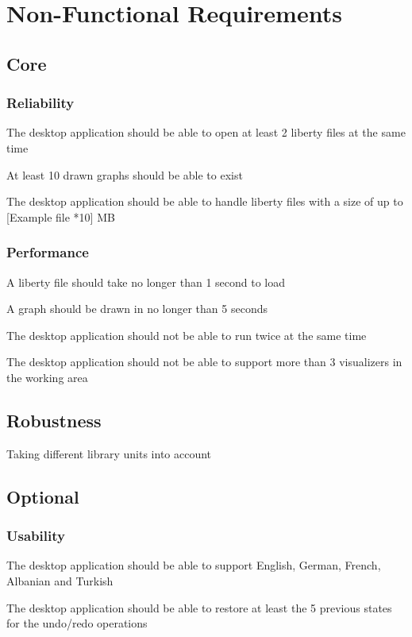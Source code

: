\documentclass[10pt,a4paper]{report}
\begin{document}
\section{Non-Functional Requirements}
\subsection{Core}
\subsubsection{Reliability}
\begin{NFR-Rel}
    \item The desktop application should be able to open at least 2 liberty files at the same time
    \item At least 10 drawn graphs should be able to exist
    \item The desktop application should be able to handle liberty files with a size of up to [Example file *10] MB
\end{NFR-Rel}

\subsubsection{Performance}
\begin{NFR-Perf}
    \item A liberty file should take no longer than 1 second to load
    \item A graph should be drawn in no longer than 5 seconds
    \item The desktop application should not be able to run twice at the same time
    \item  The desktop application should not be able to support more than 3 visualizers in the working area
\end{NFR-Perf}

\subsection{Robustness}
\begin{NFR-Rob}
    \item Taking different library units into account
\end{NFR-Rob}

\subsection{Optional}
\subsubsection{Usability}
\begin{NFRO-Usability}
    \item The desktop application should be able to support English, German, French, Albanian and Turkish
    \item The desktop application should be able to restore at least the 5 previous states for the undo/redo operations 
\end{NFRO-Usability}
\end{document}
